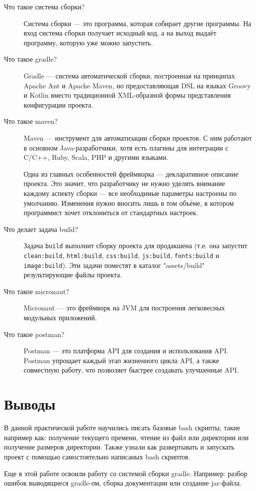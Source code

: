\begin{description}
	\item[Что такое система сборки?]
		Система сборки --- это программа, которая собирает другие программы.
		На вход система сборки получает исходный код, а на выход выдаёт
		программу, которую уже можно запустить.
	\item[Что такое gradle?]
		Gradle --- система автоматической сборки, построенная на принципах
		Apache Ant и Apache Maven, но предоставляющая DSL на языках
		Groovy и Kotlin вместо традиционной XML-образной формы представления
		конфигурации проекта.
	\item[Что такое maven?]
		Maven --- инструмент для автоматизации сборки проектов.
		С ним работают в основном Java-разработчики, хотя есть плагины
		для интеграции с C/C++, Ruby, Scala, PHP и другими языками.\par
		Одна из главных особенностей фреймворка --- декларативное описание
		проекта. Это значит, что разработчику не нужно уделять внимание
		каждому аспекту сборки --- все необходимые параметры настроены
		по умолчанию. Изменения нужно вносить лишь в том объёме,
		в котором программист хочет отклониться от стандартных настроек.
	\item[Что делает задача build?]
		Задача \texttt{build} выполнит сборку проекта для продакшена
		(т.е. она запустит \texttt{clean:build}, \texttt{html:build},
		\texttt{css:build}, \texttt{js:build}, \texttt{fonts:build}
		и \texttt{image:build}). Эти задачи поместят
		в каталог "assets/build" результирующие файлы проекта.
	\item[Что такое micronaut?]
		Micronaut --- это фреймворк на JVM для построения легковесных
		модульных приложений.
	\item[Что такое postman?]
		Postman --- это платформа API для создания и использования API.
		Postman упрощает каждый этап жизненного цикла API, а также совместную
		работу, что позволяет быстрее создавать улучшенные API.
\end{description}

\chapter*{Выводы}
В данной практической работе научились писать базовые bash скрипты, такие
например как: получение текущего премени, чтение из файл или директории или
получение размеров директории. Также узнали как развертывать и запускать
проект с помощью самостоятельно написаных bash скриптов.\par
Еще в этой работе освоили работу со системой сборки gradle.
Например: разбор ошибок выводящиеся gradle-ом, сборка документации или
создание jar-файла.

